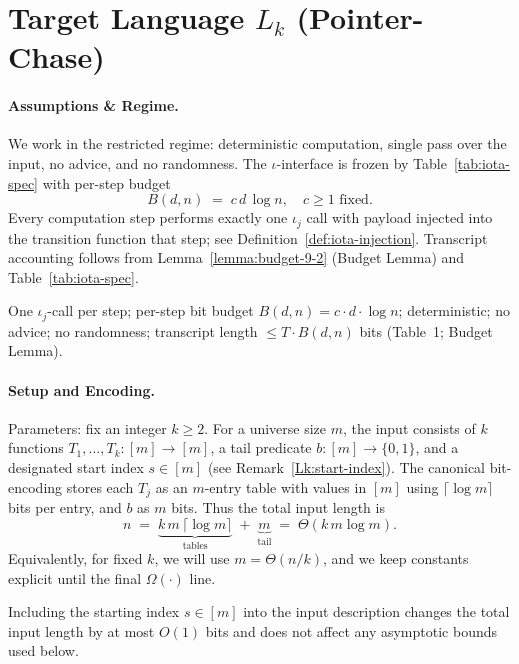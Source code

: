 
\section{Target Language \texorpdfstring{$L_k$}{Lk} (Pointer-Chase)}
\label{Lk:sec:Lk}

\paragraph{Assumptions \& Regime.}
We work in the restricted regime: deterministic computation, single pass over the input, no advice, and no randomness. The $\iota$-interface is frozen by Table~\ref{tab:iota-spec} with per-step budget
\[ B(d,n) \;=\; c\,d\,\log n, \quad c\ge 1 \text{ fixed.} \]
Every computation step performs exactly one $\iota_j$ call with payload injected into the transition function that step; see Definition~\ref{def:iota-injection}. Transcript accounting follows from Lemma~\ref{lemma:budget-9-2} (Budget Lemma) and Table~\ref{tab:iota-spec}.

\begin{tcolorbox}[title=Mini-Recap, colback=white]
One $\iota_j$-call per step; per-step bit budget $B(d,n)=c\cdot d\cdot \log n$; deterministic; no advice; no randomness; transcript length $\le T\cdot B(d,n)$ bits (Table~1; Budget Lemma).
\end{tcolorbox}

\paragraph{Setup and Encoding.}
Parameters: fix an integer $k\ge 2$. For a universe size $m$, the input consists of $k$ functions $T_1,\ldots,T_k : [m]\to[m]$, a tail predicate $b:[m]\to\{0,1\}$, and a designated start index $s\in[m]$ (see Remark~\ref{Lk:start-index}). The canonical bit-encoding stores each $T_j$ as an $m$-entry table with values in $[m]$ using $\lceil\log m\rceil$ bits per entry, and $b$ as $m$ bits. Thus the total input length is
\[
 n \;=\; \underbrace{k\,m\,\lceil\log m\rceil}_{\text{tables}} \; + \; \underbrace{m}_{\text{tail}} \;=\; \Theta(k\,m\log m).
\]
Equivalently, for fixed $k$, we will use $m = \Theta(n/k)$, and we keep constants explicit until the final $\Omega(\cdot)$ line.

\begin{remark}\label{Lk:start-index}
Including the starting index $s\in[m]$ into the input description changes the total input length by at most $O(1)$ bits and does not affect any asymptotic bounds used below.
\end{remark}

